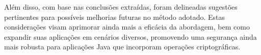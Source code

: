 \begin{itemize}
Além disso, com base nas conclusões extraídas, foram delineadas sugestões pertinentes para possíveis melhorias futuras no método adotado. Estas considerações visam aprimorar ainda mais a eficácia da abordagem, bem como expandir suas aplicações em cenários diversos, promovendo uma segurança ainda mais robusta para aplicações Java que incorporam operações criptográficas.

\end{itemize}







